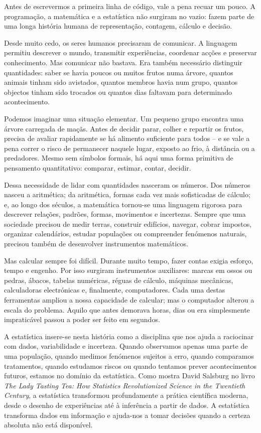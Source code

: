 \documentclass[
  portuguese,
  11pt,
  openany]{book}
\begin{document}
Antes de escrevermos a primeira linha de código, vale a pena recuar um pouco. A programação, a matemática e a estatística não surgiram no vazio: fazem parte de uma longa história humana de representação, contagem, cálculo e decisão.

Desde muito cedo, os seres humanos precisaram de comunicar. A linguagem permitiu descrever o mundo, transmitir experiências, coordenar acções e preservar conhecimento. Mas comunicar não bastava. Era também necessário distinguir quantidades: saber se havia poucos ou muitos frutos numa árvore, quantos animais tinham sido avistados, quantos membros havia num grupo, quantos objectos tinham sido trocados ou quantos dias faltavam para determinado acontecimento.

Podemos imaginar uma situação elementar. Um pequeno grupo encontra uma árvore carregada de maçãs. Antes de decidir parar, colher e repartir os frutos, precisa de avaliar rapidamente se há alimento suficiente para todos -- e se vale a pena correr o risco de permanecer naquele lugar, exposto ao frio, à distância ou a predadores. Mesmo sem símbolos formais, há aqui uma forma primitiva de pensamento quantitativo: comparar, estimar, contar, decidir.

Dessa necessidade de lidar com quantidades nasceram os números. Dos números nasceu a aritmética; da aritmética, formas cada vez mais sofisticadas de cálculo; e, ao longo dos séculos, a matemática tornou-se uma linguagem rigorosa para descrever relações, padrões, formas, movimentos e incertezas. Sempre que uma sociedade precisou de medir terras, construir edifícios, navegar, cobrar impostos, organizar calendários, estudar populações ou compreender fenómenos naturais, precisou também de desenvolver instrumentos matemáticos.

Mas calcular sempre foi difícil. Durante muito tempo, fazer contas exigia esforço, tempo e engenho. Por isso surgiram instrumentos auxiliares: marcas em ossos ou pedras, ábacos, tabelas numéricas, réguas de cálculo, máquinas mecânicas, calculadoras electrónicas e, finalmente, computadores. Cada uma destas ferramentas ampliou a nossa capacidade de calcular; mas o computador alterou a escala do problema. Aquilo que antes demorava horas, dias ou era simplesmente impraticável passou a poder ser feito em segundos.

A estatística insere-se nesta história como a disciplina que nos ajuda a raciocinar com dados, variabilidade e incerteza. Quando observamos apenas uma parte de uma população, quando medimos fenómenos sujeitos a erro, quando comparamos tratamentos, quando estudamos riscos ou quando tentamos prever acontecimentos futuros, estamos no domínio da estatística. Como mostra David Salsburg no livro \emph{The Lady Tasting Tea: How Statistics Revolutionized Science in the Twentieth Century}, a estatística transformou profundamente a prática científica moderna, desde o desenho de experiências até à inferência a partir de dados. A estatística transforma dados em informação e ajuda-nos a tomar decisões quando a certeza absoluta não está disponível.
\end{document}
